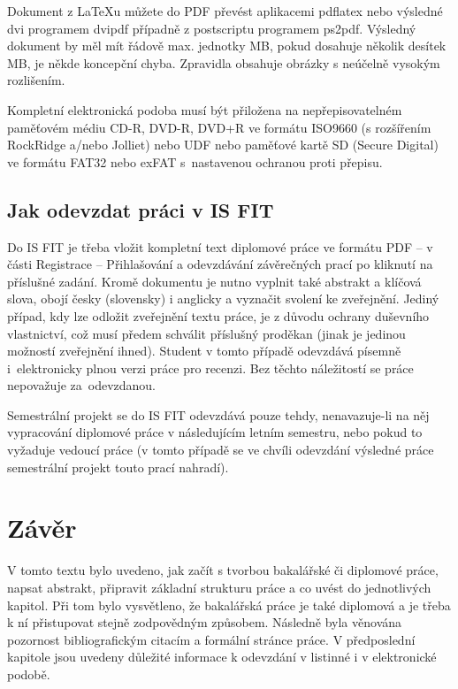 Dokument z \LaTeX{}u můžete do PDF převést aplikacemi pdflatex nebo výsledné dvi programem dvipdf případně z postscriptu programem ps2pdf. Výsledný dokument by měl mít řádově max. jednotky MB, pokud dosahuje několik desítek MB, je někde koncepční chyba. Zpravidla obsahuje obrázky s neúčelně vysokým rozlišením.

Kompletní elektronická podoba musí být přiložena na nepřepisovatelném paměťovém médiu CD-R, DVD-R, DVD+R ve formátu ISO9660 (s rozšířením RockRidge a/nebo Jolliet) nebo UDF nebo paměťové kartě SD (Secure Digital) ve formátu FAT32 nebo exFAT s~nastavenou ochranou proti přepisu.

\section{Jak odevzdat práci v IS FIT}

Do IS FIT je třeba vložit kompletní text diplomové práce ve formátu PDF -- v části Registrace -- Přihlašování a odevzdávání závěrečných prací po kliknutí na příslušné zadání. Kromě dokumentu je nutno vyplnit také abstrakt a klíčová slova, obojí česky (slovensky) i anglicky a vyznačit svolení ke zveřejnění. Jediný případ, kdy lze odložit zveřejnění textu práce, je z důvodu ochrany duševního vlastnictví, což musí předem schválit příslušný proděkan (jinak je jedinou možností zveřejnění ihned). Student v tomto případě odevzdává písemně i~elektronicky plnou verzi práce pro recenzi. Bez těchto náležitostí se práce nepovažuje za~odevzdanou.

Semestrální projekt se do IS FIT odevzdává pouze tehdy, nenavazuje-li na něj vypracování diplomové práce v následujícím letním semestru, nebo pokud to vyžaduje vedoucí práce (v tomto případě se ve chvíli odevzdání výsledné práce semestrální projekt touto prací nahradí).


\chapter{Závěr}
\label{zaver}

V tomto textu bylo uvedeno, jak začít s tvorbou bakalářské či diplomové práce, napsat abstrakt, připravit základní strukturu práce a co uvést do jednotlivých kapitol. Při tom bylo vysvětleno, že bakalářská práce je také diplomová a je třeba k ní přistupovat stejně zodpovědným způsobem. Následně byla věnována pozornost bibliografickým citacím a formální stránce práce. V předposlední kapitole jsou uvedeny důležité informace k odevzdání v listinné i v elektronické podobě.

